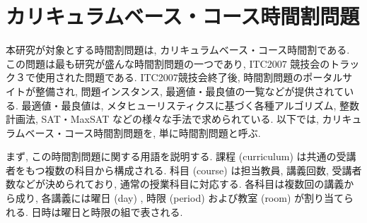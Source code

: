 \chapter{カリキュラムベース・コース時間割問題}




本研究が対象とする時間割問題は, カリキュラムベース・コース時間割である. この問題は最も研究が盛んな時間割問題の一つであり, ITC2007 競技会のトラック３で使用された問題である. ITC2007競技会終了後, 時間割問題のポータルサイトが整備され, 問題インスタンス, 最適値・最良値の一覧などが提供されている. 最適値・最良値は, メタヒューリスティクスに基づく各種アルゴリズム, 整数計画法, SAT・MaxSAT などの様々な手法で求められている. 以下では, カリキュラムベース・コース時間割問題を, 単に時間割問題と呼ぶ.

まず, この時間割問題に関する用語を説明する. 課程 (curriculum) は共通の受講者をもつ複数の科目から構成される. 科目 (course) は担当教員, 講義回数, 受講者数などが決められており, 通常の授業科目に対応する. 各科目は複数回の講義から成り, 各講義には曜日 (day) , 時限 (period) および教室 (room) が割り当てられる. 日時は曜日と時限の組で表される.



